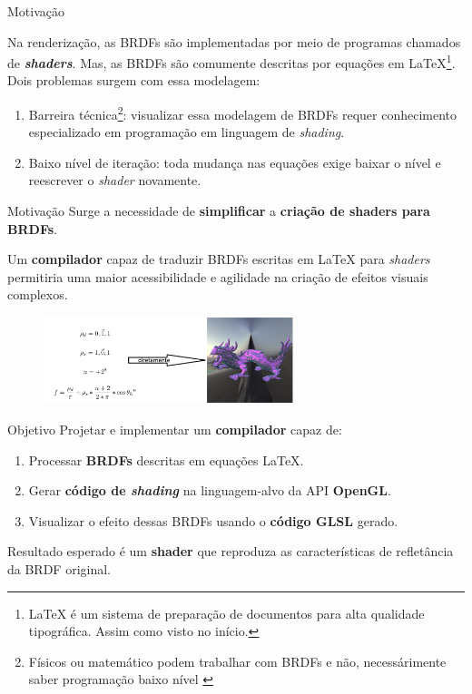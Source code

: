 \begin{frame}{Motivação}

    Na renderização, as BRDFs são implementadas por meio de programas chamados de \textit{\textbf{shaders}}. Mas, as BRDFs são comumente descritas por equações em \LaTeX \footnote{\tiny{ \LaTeX{} é um sistema de preparação de documentos para alta qualidade tipográfica. Assim como visto no início.}}. Dois problemas surgem com essa modelagem:

    \begin{enumerate}
        \item Barreira técnica\footnote{\tiny{Físicos ou matemático podem trabalhar com BRDFs e não, necessárimente saber programação baixo nível }}: visualizar essa modelagem de BRDFs requer conhecimento especializado em programação em linguagem de \textit{shading}.
    \item Baixo nível de iteração: toda mudança nas equações exige baixar o nível e reescrever o \textit{shader} novamente.
    \end{enumerate}

\end{frame}


\begin{frame}{Motivação}
        Surge a necessidade de \textbf{simplificar} a \textbf{criação de shaders para BRDFs}. \\\hspace{2cm}


    Um \textbf{compilador} capaz de traduzir BRDFs escritas em \LaTeX{} para \textit{shaders} permitiria uma maior acessibilidade e agilidade na criação de efeitos visuais complexos.
    \begin{figure}[H]
        \begin{center}
            \includegraphics[width=0.65\textwidth]{./Imagens/diretamente.png}
        \end{center}
    \end{figure}
\end{frame}



\begin{frame}{Objetivo}
    Projetar e implementar um \textbf{compilador} capaz de:

    \begin{enumerate}
        \item Processar \textbf{BRDFs} descritas em equações \LaTeX{}.
        \item Gerar \textbf{código de \textit{shading}} na linguagem-alvo da API \textbf{OpenGL}.
        \item Visualizar o efeito dessas BRDFs usando o \textbf{código GLSL} gerado.
    \end{enumerate}

    Resultado esperado é um \textbf{shader} que reproduza as características de refletância da BRDF original.
\end{frame}
